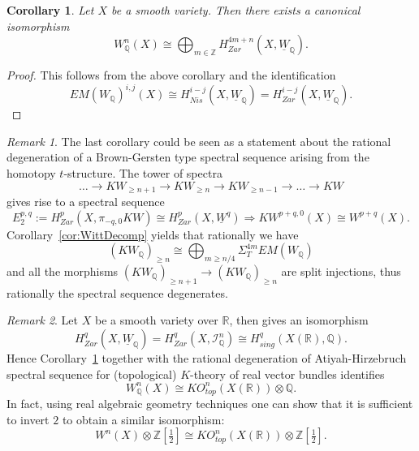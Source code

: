 \documentclass[a4paper,12pt,draft]{amsart}
\newtheorem{corollary}{Corollary}
\theoremstyle{definition}
\theoremstyle{remark}
\newtheorem{remark}{Remark}
\begin{document}
\begin{corollary}\label{cor:Witt}
Let $X$ be a smooth variety. Then there exists a canonical isomorphism
\[
W^{n}_{{\mathbb Q}}(X)\cong \bigoplus_{m\in {{\mathbb Z}}} H^{4m+n}_{Zar}(X,\underline{W}_{{\mathbb Q}}).
\]
\end{corollary}
\begin{proof}
This follows from the above corollary and the identification
\[
EM(W_{{\mathbb Q}})^{i,j}(X)\cong H^{i-j}_{Nis}(X,\underline{W}_{{\mathbb Q}})=H^{i-j}_{Zar}(X,\underline{W}_{{\mathbb Q}}).
\]
\end{proof}

\begin{remark} The last corollary could be seen as a statement about the rational degeneration of a Brown-Gersten type spectral sequence arising from the homotopy $t$-structure. The tower of spectra 
\[
\hdots \to KW_{\ge n+1}\to KW_{\ge n} \to KW_{\ge n-1} \to \hdots \to KW
\]
gives rise to a spectral sequence 
\[
E_2^{p,q}:= H^p_{Zar}(X, \pi_{-q,0}KW)\cong H^p_{Zar}(X, \underline{W}^{q}) \Longrightarrow KW^{p+q,0}(X)\cong W^{p+q}(X).
\]
Corollary~\ref{cor:WittDecomp} yields that rationally we have
\[
(KW_{{\mathbb Q}})_{\ge n}\cong \bigoplus_{m\ge n/4} \Sigma_T^{4m} EM(W_{{\mathbb Q}})
\]
and all the morphisms $(KW_{{\mathbb Q}})_{\ge n+1}\to (KW_{{\mathbb Q}})_{\ge n}$ are split injections, thus rationally the spectral sequence degenerates.
\end{remark}

\begin{remark}
Let $X$ be a smooth variety over $\mathbb{R}$, then \cite[Theorem~1.1]{Jac15} gives an isomorphism 
\[
H^q_{Zar}(X, \underline{W}_{{\mathbb Q}})= H^q_{Zar}(X, \mathcal{I}^n_{{\mathbb Q}})\cong H^q_{sing}(X(\mathbb{R}), {{\mathbb Q}}).
\]
Hence Corollary~\ref{cor:Witt} together with the rational degeneration of Atiyah-Hirzebruch spectral sequence for (topological) $K$-theory of real vector bundles identifies
\[
W^{n}_{{\mathbb Q}}(X)\cong KO_{top}^n(X(\mathbb{R}))\otimes {{\mathbb Q}}.
\]
In fact, using real algebraic geometry techniques one can show \cite{Br84} that it is sufficient to invert $2$ to obtain a similar isomorphism:
\[
W^{n}(X)\otimes {{\mathbb Z}}[\tfrac{1}{2}] \cong KO_{top}^n(X(\mathbb{R}))\otimes {{\mathbb Z}}[\tfrac{1}{2}].
\]
\end{remark}
\end{document}
